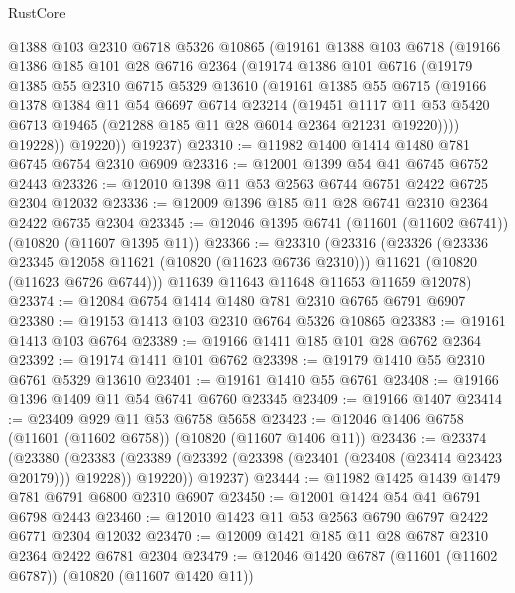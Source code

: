 \begin{lexlean}{RustCore}
\begin{coremodule}
      @1388
      @103
      @2310
      @6718
      @5326
      @10865
      (@19161
        @1388
        @103
        @6718
        (@19166
          @1386
          @185
          @101
          @28
          @6716
          @2364
          (@19174
            @1386
            @101
            @6716
            (@19179
              @1385
              @55
              @2310
              @6715
              @5329
              @13610
              (@19161
                @1385
                @55
                @6715
                (@19166
                  @1378
                  @1384
                  @11
                  @54
                  @6697
                  @6714
                  @23214
                  (@19451
                    @1117
                    @11
                    @53
                    @5420
                    @6713
                    @19465
                    (@21288 @185 @11 @28 @6014 @2364 @21231 @19220))))
              @19228))
          @19220))
      @19237)
@23310 := @11982 @1400 @1414 @1480 @781 @6745 @6754 @2310 @6909
@23316 := @12001 @1399 @54 @41 @6745 @6752 @2443
@23326 := @12010 @1398 @11 @53 @2563 @6744 @6751 @2422 @6725 @2304 @12032
@23336 := @12009 @1396 @185 @11 @28 @6741 @2310 @2364 @2422 @6735 @2304
@23345 := @12046 @1395 @6741 (@11601 (@11602 @6741)) (@10820 (@11607 @1395 @11))
@23366 := @23310
    (@23316
      (@23326
        (@23336 @23345 @12058 @11621 (@10820 (@11623 @6736 @2310)))
        @11621
        (@10820 (@11623 @6726 @6744)))
      @11639
      @11643
      @11648
      @11653
      @11659
      @12078)
@23374 := @12084 @6754 @1414 @1480 @781 @2310 @6765 @6791 @6907
@23380 := @19153 @1413 @103 @2310 @6764 @5326 @10865
@23383 := @19161 @1413 @103 @6764
@23389 := @19166 @1411 @185 @101 @28 @6762 @2364
@23392 := @19174 @1411 @101 @6762
@23398 := @19179 @1410 @55 @2310 @6761 @5329 @13610
@23401 := @19161 @1410 @55 @6761
@23408 := @19166 @1396 @1409 @11 @54 @6741 @6760 @23345
@23409 := @19166 @1407
@23414 := @23409 @929 @11 @53 @6758 @5658
@23423 := @12046 @1406 @6758 (@11601 (@11602 @6758)) (@10820 (@11607 @1406 @11))
@23436 := @23374
    (@23380
      (@23383 (@23389 (@23392 (@23398 (@23401 (@23408 (@23414 @23423 @20179))) @19228)) @19220))
      @19237)
@23444 := @11982 @1425 @1439 @1479 @781 @6791 @6800 @2310 @6907
@23450 := @12001 @1424 @54 @41 @6791 @6798 @2443
@23460 := @12010 @1423 @11 @53 @2563 @6790 @6797 @2422 @6771 @2304 @12032
@23470 := @12009 @1421 @185 @11 @28 @6787 @2310 @2364 @2422 @6781 @2304
@23479 := @12046 @1420 @6787 (@11601 (@11602 @6787)) (@10820 (@11607 @1420 @11))

\end{coremodule}
\end{lexlean}
